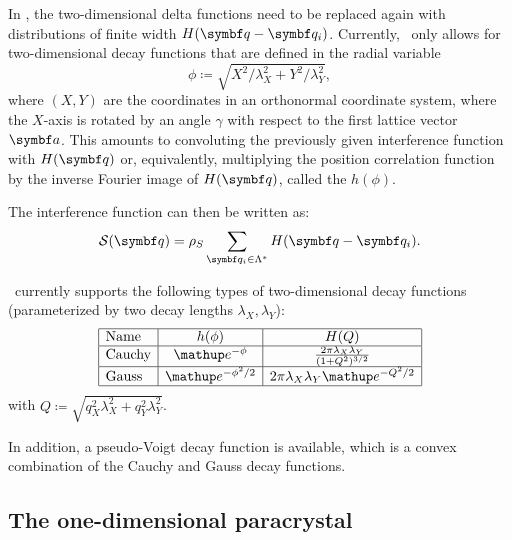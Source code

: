 In \BornAgain, the two-dimensional delta functions need to be replaced again with
distributions of finite width $H(\q - \q_i)$. Currently, \BornAgain\ only allows for two-dimensional
decay functions that are defined in the radial variable
\begin{equation}
  \phi \coloneqq \sqrt{X^2/\lambda_X^2 + Y^2/\lambda_Y^2},
\end{equation}
where $(X,Y)$ are the coordinates in an orthonormal coordinate system,
where the $X$-axis is rotated
by an angle $\gamma$ with respect to the first lattice vector $\v a$.
This amounts to convoluting the
previously given interference function with $H(\q)$ or, equivalently, multiplying
the position correlation function by the inverse Fourier image of $H(\q)$, called the
 $h(\phi)$.

The interference function can then be written as:
\begin{equation}
  \SD(\q) = \rho_S \sum_{\q_i\in\Lambda^*} H(\q - \q_i).
\end{equation}

\BornAgain\ currently supports the following types of two-dimensional decay functions
(parameterized by two decay lengths $\lambda_X, \lambda_Y$):
\begin{equation}
  \begin{array}{|l|c|c|}
    \hline
    \text{Name} & h(\phi) & H(Q) \\
    \hline
    \text{Cauchy} & \e^{-\phi} & \frac{2\pi\lambda_X\lambda_Y}{(1+Q^2)^{3/2}} \\
    \hline
    \text{Gauss} & \e^{-\phi^2/2} & 2\pi\lambda_X\lambda_Y \e^{-Q^2/2} \\
    \hline
  \end{array}
\end{equation}
with $Q \coloneqq \sqrt{q_X^2\lambda_X^2 + q_Y^2\lambda_Y^2}$.

In addition, a pseudo-Voigt decay function is available,
which is a convex combination of the Cauchy and Gauss decay functions.

\subsection{The one-dimensional paracrystal} \label{sec:sect:1dparacrystal}

